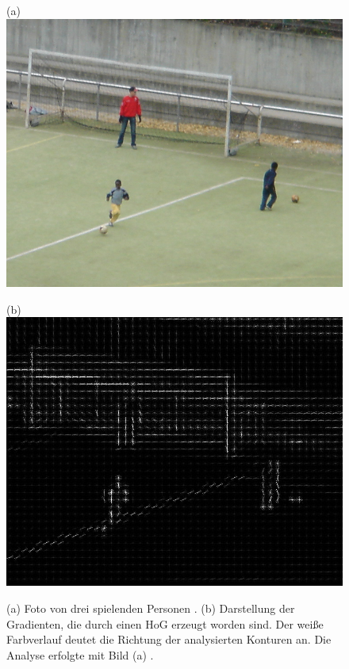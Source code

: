 
\begin{figure}[H]
	\centering
	\begin{minipage}[b]{0.47\textwidth}
		(a)
		\includegraphics[width=\textwidth]{Bilder/hog1crop.png}
	\end{minipage}
	\hfill
	\begin{minipage}[b]{0.47\textwidth}
		(b)
		\includegraphics[width=\textwidth]{Bilder/hog2crop.jpg}
	\end{minipage}
	\caption{(a) Foto von drei spielenden Personen \cite{inria1}. (b) Darstellung der Gradienten, die durch einen HoG erzeugt worden sind. Der weiße Farbverlauf deutet die Richtung der analysierten Konturen an. Die Analyse erfolgte mit Bild (a) \cite{inria1}.}
	\label{fiq: hog}
\end{figure}

